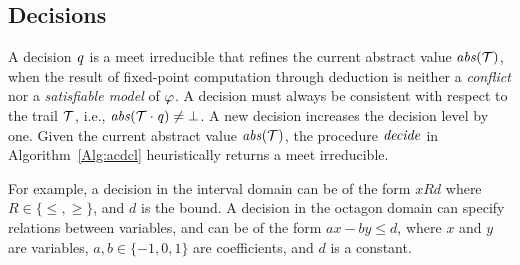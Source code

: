 \subsection{Decisions}\label{sec:decide}
%
A decision $\mathit{q}$ is a meet irreducible that refines the
current abstract value $\mathit{abs}(\mathcal{T})$, when the result of fixed-point 
computation through deduction is neither a {\em conflict} nor a {\em 
satisfiable model} 
of $\varphi$.  A decision must always be consistent 
with respect to the trail $\mathcal{T}$, 
i.e., $\mathit{abs}(\mathcal{T}\cdot \mathit{q})\neq \bot$.  A new 
decision increases the decision level by one. Given the 
current abstract value $\mathit{abs}(\mathcal{T})$, the procedure $\mathit{decide}$ 
in Algorithm~\ref{Alg:acdcl} heuristically returns a meet irreducible.


%
For example, a decision in the interval domain can be of the form 
$x R d$ where $R \in \{\leq,\allowbreak\geq\}$, and $d$ 
is the bound.  A decision in the octagon domain can specify relations 
between variables, and can be of the form $ax - by \leq d$, where 
$x$ and $y$ are variables, $a,b \in \{-1,0,1\}$ are coefficients, 
and $d$ is a constant.
%

%

